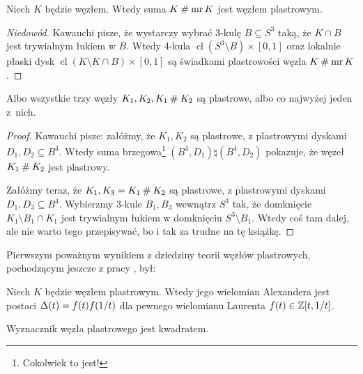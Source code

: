 \begin{proposition}
    Niech $K$ będzie węzłem.
    Wtedy suma $K \mathbin{\#} \operatorname{mr} K$ jest węzłem plastrowym.
\end{proposition}

\begin{proof}[Niedowód]
    Kawauchi \cite[s. 155]{kawauchi1996} pisze, że wystarczy wybrać 3-kulę $B \subseteq S^3$ taką, że $K \cap B$ jest trywialnym łukiem w $B$.
    Wtedy 4-kula $\operatorname{cl} (S^3 \setminus B) \times [0,1]$ oraz lokalnie płaski dysk $\operatorname{cl} (K \setminus K \cap B) \times [0,1] $ są świadkami plastrowości węzła $K \mathbin{\#} \operatorname{mr} K$.
\end{proof}

\begin{proposition}
    Albo wszystkie trzy węzły $K_1, K_2, K_1 \mathbin{\#} K_2$ są plastrowe, albo co najwyżej jeden z~nich.
\end{proposition}

\begin{proof}
    Kawauchi \cite[s. 155]{kawauchi1996} pisze: załóżmy, że $K_1, K_2$ są plastrowe, z plastrowymi dyskami $D_1, D_2 \subseteq B^4$.
    Wtedy suma brzegowa\footnote{Cokolwiek to jest!} $(B^4, D_1) \natural (B^4, D_2)$ pokazuje, że węzeł $K_1 \mathbin{\#} K_2$ jest plastrowy.

    Załóżmy teraz, że $K_1, K_3 = K_1 \mathbin{\#} K_2$ są plastrowe, z plastrowymi dyskami $D_1, D_3 \subseteq B^4$.
    Wybierzmy 3-kule $B_1, B_3$ wewnątrz $S^3$ tak, że domknięcie $K_1 \setminus B_1 \cap K_1$ jest trywialnym łukiem w domknięciu $S^3 \setminus B_1$.
    Wtedy coś tam dalej, ale nie warto tego przepisywać, bo i tak za trudne na tę książkę.
\end{proof}

Pierwszym poważnym wynikiem z dziedziny teorii węzłów plastrowych, pochodzącym jeszcze z pracy \cite{fox1966}, był:

\begin{proposition}
%
    Niech $K$ będzie węzłem plastrowym.
    Wtedy jego wielomian Alexandera jest postaci $\Delta(t) = f(t) f(1/t)$ dla pewnego wielomianu Laurenta $f(t) \in \mathbb Z[t, 1/t]$.
\end{proposition}

\begin{corollary}
    \label{det_slice_square}%
    Wyznacznik węzła plastrowego jest kwadratem.
\end{corollary}

